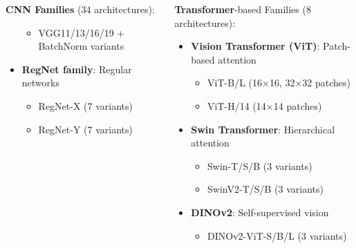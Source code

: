 \documentclass[aspectratio=43]{beamer}
\begin{document}
\begin{frame}
\begin{columns}
\begin{column}{0.5\textwidth}
\begin{block}{\tiny \textbf{CNN Families} (34 architectures):}
\begin{itemize}
\begin{itemize}
                            \item VGG11/13/16/19 + BatchNorm variants
                        \end{itemize}
                    \item \textbf{RegNet family}: Regular networks
                        \begin{itemize}
                            \tiny
                            \item RegNet-X (7 variants)
                            \item RegNet-Y (7 variants)
                        \end{itemize}
                \end{itemize}
            \end{block}
        \end{column}
        \begin{column}{0.5\textwidth}
            \tiny
            \begin{block}{\tiny \textbf{Transformer}-based Families (8 architectures):}
                \begin{itemize}
                    \item \textbf{Vision Transformer (ViT)}: Patch-based attention
                        \begin{itemize}
                            \tiny
                            \item ViT-B/L (16×16, 32×32 patches)
                            \item ViT-H/14 (14×14 patches)
                        \end{itemize}
                    \item \textbf{Swin Transformer}: Hierarchical attention
                        \begin{itemize}
                            \tiny
                            \item Swin-T/S/B (3 variants)
                            \item SwinV2-T/S/B (3 variants)
                        \end{itemize}
                    \item \textbf{DINOv2}: Self-supervised vision
                        \begin{itemize}
                            \tiny
                            \item DINOv2-ViT-S/B/L (3 variants)
                        \end{itemize}
                \end{itemize}

\end{block}
\end{column}
\end{columns}
\end{frame}
\end{document}
